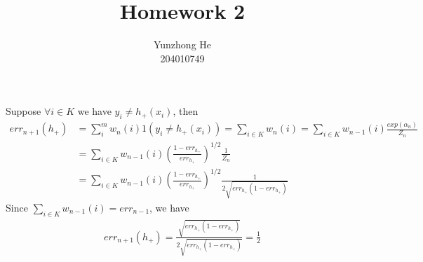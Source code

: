 \documentclass[12pt]{article}
\newenvironment{problem}[2][Problem]{\begin{trivlist}
\item[\hskip \labelsep {\bfseries #1}\hskip \labelsep {\bfseries #2}]}{\end{trivlist}}
\begin{document}
 
 
\title{Homework 2}%
\author{Yunzhong He\\ %
204010749} %
 
\maketitle
 
\begin{problem}{Problem 1}
\item{}
Suppose $\forall i \in K$ we have $y_i \neq h_+(x_i)$, then
\begin{align*}
	err_{n+1}(h_+) &= \sum_{i}^m w_n(i)1(y_i \neq h_+(x_i)) = \sum_{i \in K} w_n(i) 
     = \sum_{i \in K} w_{n-1}(i) \frac{exp(\alpha_n)}{Z_n} \\
    &= \sum_{i \in K} w_{n-1}(i) (\frac{1-err_{h_+}}{err_{h_+}})^{1/2} \frac{1}{Z_{n}} \\
    &= \sum_{i \in K} w_{n-1}(i) (\frac{1-err_{h_+}}{err_{h_+}})^{1/2} \frac{1}{2\sqrt{err_{h_+}(1-err_{h_+})}} 
\end{align*}
Since $\sum_{i \in K}w_{n-1}(i) = err_{n-1}$, we have
\begin{align*}
	err_{n+1}(h_+) = \frac{\sqrt{err_{h_+}(1-err_{h_+})}}{2\sqrt{err_{h_+}(1-err_{h_+})}} = \frac{1}{2}
\end{align*}
\end{problem}
\end{document}
